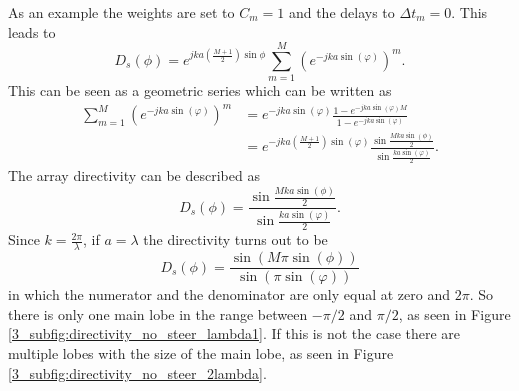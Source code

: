 As an example the weights are set to $C_m = 1$ and the delays to $\Delta t_m = 0$. This leads to
\begin{equation}
   D_s(\phi)
    = 
    e^{jka\left ( \frac{M+1}{2} \right )\sin{\phi} } \sum_{m=1}^M \left ( e^{-jka \sin{(\varphi)}} \right ) ^ m .
\end{equation}
This can be seen as a geometric series which can be written as 
\begin{align}
   \sum_{m=1}^M \left ( e^{-jka \sin{(\varphi)}} \right ) ^ m
    &= 
     e^{-jka \sin{(\varphi)}}\frac{1 - e^{-jka \sin{(\varphi) M }}}{1 - e^{-jka \sin{(\varphi)}}} \\
     &=
     e^{-jka\left ( \frac{M + 1}{2}\right ) \sin{(\varphi)}} \frac{\sin{\frac{Mka\sin{(\phi)}}{2}}}{\sin{\frac{ka\sin{(\varphi)}}{2}}}.
\end{align}
The array directivity can be described as
\begin{equation}
    D_s(\phi) 
    = 
    \frac{\sin{\frac{Mka\sin{(\phi)}}{2}}}{\sin{\frac{ka\sin{(\varphi)}}{2}}}.
    \label{3_eq:directivity_no_delay}
\end{equation}
Since $k = \frac{2\pi}{\lambda}$, if $a = \lambda$ the directivity turns out to be
\begin{equation}
    D_s(\phi) 
    = 
    \frac{\sin{\left ( M\pi\sin{(\phi)} \right )} }{ \sin{\left ( \pi\sin{(\varphi)}\right )}}
\end{equation}
in which the numerator and the denominator are only equal at zero and $2\pi$. So there is only one main lobe in the range between $-\pi/2$ and $\pi/2$, as seen in Figure \ref{3_subfig:directivity_no_steer_lambda1}. If this is not the case there are multiple lobes with the size of the main lobe, as seen in Figure \ref{3_subfig:directivity_no_steer_2lambda}.
